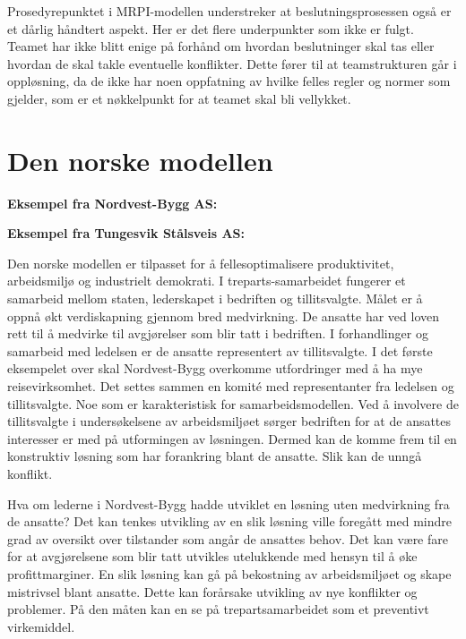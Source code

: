 \documentclass[norsk]{article}
\begin{document}
Prosedyrepunktet i MRPI-modellen understreker at beslutningsprosessen også er et dårlig håndtert aspekt. Her er det flere underpunkter som ikke er fulgt. Teamet har ikke blitt enige på forhånd om hvordan beslutninger skal tas eller hvordan de skal takle eventuelle konflikter. Dette fører til at teamstrukturen går i oppløsning, da de ikke har noen oppfatning av hvilke felles regler og normer som gjelder, som er et nøkkelpunkt for at teamet skal bli vellykket. 

\newpage
\section{Den norske modellen}

\textbf{Eksempel fra Nordvest-Bygg AS:}


\textbf{Eksempel fra Tungesvik Stålsveis AS:}


Den norske modellen er tilpasset for å fellesoptimalisere produktivitet, arbeidsmiljø og industrielt demokrati. I treparts-samarbeidet fungerer et samarbeid mellom staten, lederskapet i bedriften og tillitsvalgte. Målet er å oppnå økt verdiskapning gjennom bred medvirkning\cite{torvatn}. De ansatte har ved loven rett til å medvirke til avgjørelser som blir tatt i bedriften. I forhandlinger og samarbeid med ledelsen er de ansatte representert av tillitsvalgte. I det første eksempelet over skal Nordvest-Bygg overkomme utfordringer med å ha mye reisevirksomhet. Det settes sammen en komité med representanter fra ledelsen og tillitsvalgte. Noe som er karakteristisk for samarbeidsmodellen. Ved å involvere de tillitsvalgte i undersøkelsene av arbeidsmiljøet sørger bedriften for at de ansattes interesser er med på utformingen av løsningen. Dermed kan de komme frem til en konstruktiv løsning som har forankring blant de ansatte. Slik kan de unngå konflikt. 

Hva om lederne i Nordvest-Bygg hadde utviklet en løsning uten medvirkning fra de ansatte? Det kan tenkes utvikling av en slik løsning ville foregått med mindre grad av oversikt over tilstander som angår de ansattes behov. Det kan være fare for at avgjørelsene som blir tatt utvikles utelukkende med hensyn til å øke profittmarginer. En slik løsning kan gå på bekostning av arbeidsmiljøet og skape mistrivsel blant ansatte. Dette kan forårsake utvikling av nye konflikter og problemer. På den måten kan en se på trepartsamarbeidet som et preventivt virkemiddel.  
\end{document}

